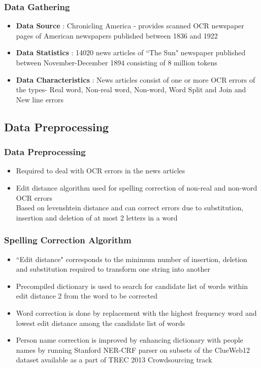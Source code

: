 \documentclass{beamer}
\begin{document}
\begin{frame}

\frametitle{Data Gathering}
\begin{itemize}
\item \textbf{Data Source} : Chronicling America - provides scanned OCR newspaper pages of American newspapers published between 1836 and 1922 
\item \textbf{Data Statistics} : 14020 news articles of ``The Sun" newspaper published between November-December 1894 consisting of 8 million tokens
\item \textbf{Data Characteristics} : News articles consist of one or more OCR errors of the types- Real word, Non-real word, Non-word, Word Split and Join and New line errors
\end{itemize}
\end{frame} 

\subsection{Data Preprocessing}

\begin{frame}
\frametitle{Data Preprocessing}
\begin{itemize}
\item
Required to deal with OCR errors in the news articles
\item
Edit distance algorithm used for spelling correction of non-real and non-word OCR errors\\ \vspace{0.2in}
Based on levenshtein distance and can correct errors due to substitution, insertion and deletion of at most 2 letters in a word 
\end{itemize}
\end{frame}

\begin{frame}
\frametitle{Spelling Correction Algorithm}
\begin{itemize}
\item ``Edit distance" corresponds to the minimum number of insertion, deletion and substitution required to transform one string into another
\item Precompiled dictionary is used to search for candidate list of words within edit distance 2 from the word to be corrected
 \item Word correction is done by replacement with the highest frequency word and lowest edit distance among the candidate list of words
\item Person name correction is improved by enhancing dictionary with people names by running Stanford NER-CRF parser on subsets of the ClueWeb12 dataset available as a part of TREC 2013 Crowdsourcing track

\end{itemize}
\end{frame}
\end{document}

